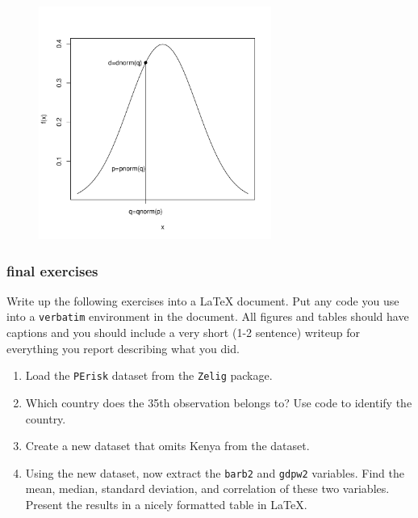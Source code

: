 \documentclass[handout]{beamer}
\begin{document}
\begin{frame}
\begin{figure}
\includegraphics[width=3in, height=3in]{rslides-normal.pdf}
\end{figure}
\end{frame}

\begin{frame}[fragile]
\frametitle{final exercises}
Write up the following exercises into a \LaTeX\hspace{1pt} document.  Put any code you use into a {\tt verbatim} environment in the document.  All figures and tables should have captions and you should include a very short (1-2 sentence) writeup for everything you report describing what you did.
\bigskip
\begin{enumerate}
\item Load the {\tt PErisk} dataset from the {\tt Zelig} package.
\item Which country does the 35th observation belongs to?  Use code to identify the country.
\item Create a new dataset that omits Kenya from the dataset.
\item Using the new dataset, now extract the {\tt barb2} and {\tt gdpw2} variables.  Find the mean, median, standard deviation, and correlation of these two variables.  Present the results in a nicely formatted table in \LaTeX.
\end{enumerate}
\end{frame}
\end{document}
